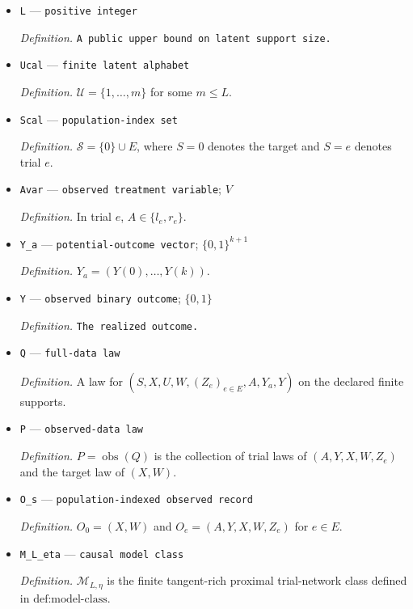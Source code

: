 \documentclass{article}
\begin{document}
\begin{itemize}
  \par\smallskip\noindent\emph{Definition.} \(\mathcal Z_e\) is the support of \(Z_e\) for each \(e\in E\).
  \item \texttt{L} --- \texttt{positive integer}
  \par\smallskip\noindent\emph{Definition.} \texttt{A public upper bound on latent support size.}
  \item \texttt{Ucal} --- \texttt{finite latent alphabet}
  \par\smallskip\noindent\emph{Definition.} \(\mathcal U=\{1,\ldots,m\}\) for some \(m\le L\).
  \item \texttt{Scal} --- \texttt{population-\allowbreak{}index set}
  \par\smallskip\noindent\emph{Definition.} \(\mathcal S=\{0\}\cup E\), where \(S=0\) denotes the target and \(S=e\) denotes trial \(e\).
  \item \texttt{Avar} --- \texttt{observed treatment variable}; \(V\)
  \par\smallskip\noindent\emph{Definition.} In trial \(e\), \(A\in\{l_e,r_e\}\).
  \item \texttt{Y\_\allowbreak{}a} --- \texttt{potential-\allowbreak{}outcome vector}; \(\{0,1\}^{k+1}\)
  \par\smallskip\noindent\emph{Definition.} \(Y_a=(Y(0),\ldots,Y(k))\).
  \item \texttt{Y} --- \texttt{observed binary outcome}; \(\{0,1\}\)
  \par\smallskip\noindent\emph{Definition.} \texttt{The realized outcome.}
  \item \texttt{Q} --- \texttt{full-\allowbreak{}data law}
  \par\smallskip\noindent\emph{Definition.} A law for \((S,X,U,W,(Z_e)_{e\in E},A,Y_a,Y)\) on the declared finite supports.
  \item \texttt{P} --- \texttt{observed-\allowbreak{}data law}
  \par\smallskip\noindent\emph{Definition.} \(P=\operatorname{obs}(Q)\) is the collection of trial laws of \((A,Y,X,W,Z_e)\) and the target law of \((X,W)\).
  \item \texttt{O\_\allowbreak{}s} --- \texttt{population-\allowbreak{}indexed observed record}
  \par\smallskip\noindent\emph{Definition.} \(O_0=(X,W)\) and \(O_e=(A,Y,X,W,Z_e)\) for \(e\in E\).
  \item \texttt{M\_\allowbreak{}L\_\allowbreak{}eta} --- \texttt{causal model class}
  \par\smallskip\noindent\emph{Definition.} \(\mathcal M_{L,\eta}\) is the finite tangent-rich proximal trial-network class defined in \(\text{def:model-class}\).

\end{itemize}
\end{document}
